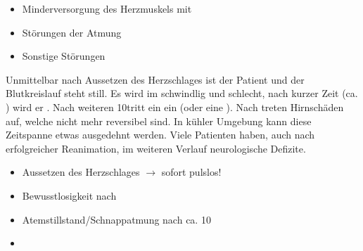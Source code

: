 {
\begin{itemize}
  \item Minderversorgung des Herzmuskels mit \par
  \item Störungen der Atmung\par
  \item Sonstige Störungen\par
\end{itemize}
}{}{}{}{}

{Unmittelbar nach Aussetzen des Herzschlages ist der Patient
 und der Blutkreislauf steht still. Es wird im
schwindlig und schlecht, nach kurzer Zeit (ca.
\Sek*) wird er . Nach weiteren
10\Sek* tritt ein  ein (oder eine
).
Nach \Min* treten Hirnschäden auf, welche nicht
mehr reversibel sind. In kühler Umgebung kann diese
Zeitspanne etwas ausgedehnt werden.
Viele Patienten haben, auch nach erfolgreicher Reanimation,
im weiteren Verlauf neurologische Defizite.
}{
\begin{itemize}
  \item Aussetzen des Herzschlages $\rightarrow$ 
  sofort pulslos!
  \item[\Sign{→}] Bewusstlosigkeit nach \Sek*
  \item[\Sign{→}] Atemstillstand/Schnappatmung nach ca. 10\Sek*
  \item[\Sign{→}] 
\end{itemize}

}{}{}{}




